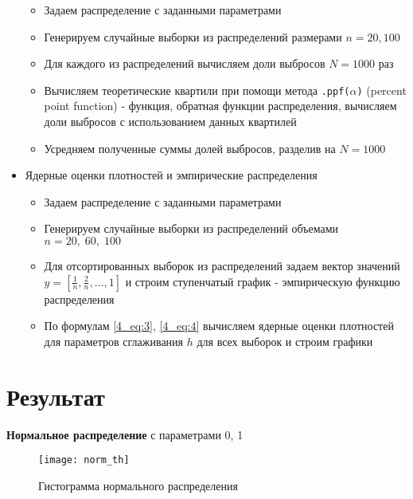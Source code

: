 \documentclass[12pt]{article}
\begin{document}
\begin{itemize}
{\begin{itemize}
	    \item Задаем распределение с заданными параметрами 
	    \item Генерируем случайные выборки из распределений размерами $n = 20, 100$
	    \item Для каждого из распределений вычисляем доли выбросов $N = 1000$ раз
	    \item Вычисляем теоретические квартили при помощи метода \texttt{.ppf($\alpha$)} (percent point function) - функция, обратная функции распределения, вычисляем доли выбросов с использованием данных квартилей
	    \item Усредняем полученные суммы долей выбросов, разделив на $N = 1000$ 
	\end{itemize}}
	\item {Ядерные оценки плотностей и эмпирические распределения
	\begin{itemize}
	    \item Задаем распределение с заданными параметрами 
	    \item Генерируем случайные выборки из распределений объемами $n = 20, \; 60, \; 100$
	    \item Для отсортированных выборок из распределений задаем вектор значений $y = [\frac{1}{n}, \frac{2}{n}, \ldots, 1]$ и строим ступенчатый график - эмпирическую функцию распределения 
	    \item По формулам \eqref{4_eq:3}, \eqref{4_eq:4} вычисляем ядерные оценки плотностей для параметров сглаживания $h$ для всех выборок и строим графики 
	\end{itemize}}
\end{itemize}


\newpage
\section*{Результат}

\textbf{Нормальное распределение} с параметрами 0, 1
\begin{figure}[h!]
	\centering
	\texttt{[image: norm\_th]}
	\caption{Гистограмма нормального распределения}
	\label{1_pic:1}
\end{figure}
\end{document}
